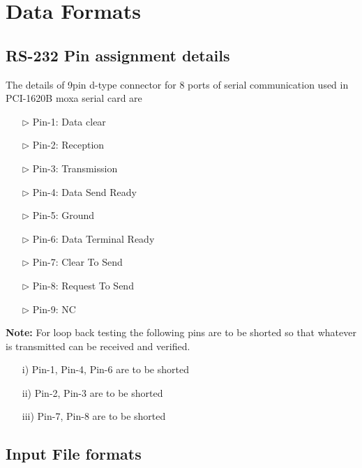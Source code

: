 \chapter{Data Formats}
\label{Chapter7}
\section{RS-232 Pin assignment details}
The details of 9pin d-type connector for 8 ports of serial communication used in PCI-1620B moxa serial card are
	\begin{enumerate}
		\item [$\rhd$] Pin-1: Data clear
		\item [$\rhd$] Pin-2: Reception
		\item [$\rhd$] Pin-3: Transmission
		\item [$\rhd$] Pin-4: Data Send Ready
		\item [$\rhd$] Pin-5: Ground
		\item [$\rhd$] Pin-6: Data Terminal Ready
		\item [$\rhd$] Pin-7: Clear To Send
		\item [$\rhd$] Pin-8: Request To Send
		\item [$\rhd$] Pin-9: NC
	\end{enumerate}
\textbf{Note:} For loop back testing the following pins are to be shorted so that whatever is transmitted can be received and verified.
\begin{enumerate}
	\item [i)] Pin-1, Pin-4, Pin-6 are to be shorted
	\item [ii)] Pin-2, Pin-3 are to be shorted
	\item [iii)] Pin-7, Pin-8 are to be shorted
\end{enumerate}
\section{Input File formats}
\label{Section:InpFileFormat}

